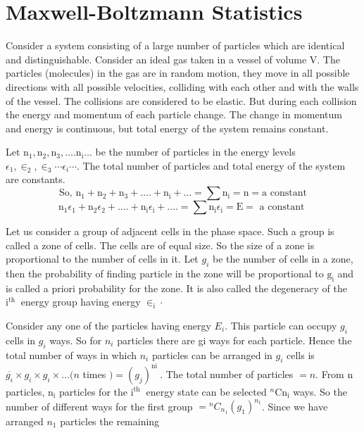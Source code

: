 \section{Maxwell-Boltzmann Statistics}
Consider a system consisting of a large number of particles which are identical and distinguishable. Consider an ideal gas taken in a vessel of volume V. The particles (molecules) in the gas are in random motion, they move in all possible directions with all possible velocities, colliding with each other and with the walls of the vessel. The collisions are considered to be elastic. But during each collision the energy and momentum of each particle change. The change in momentum and energy is continuous, but total energy of the system remains constant.\\
\par Let $\mathrm{n}_{1}, \mathrm{n}_{2}, \mathrm{n}_{3}, \ldots . \mathrm{n}_{\mathrm{i}} \ldots$ be the number of particles in the energy levels $\epsilon_{1}, \in_{2}, \in_{3} \cdots \epsilon_{i} \cdots$. The total number of particles and total energy of the system are constants.
\begin{equation}
\text{So, }\mathrm{n}_{1}+\mathrm{n}_{2}+\mathrm{n}_{3}+\ldots .+\mathrm{n}_{\mathrm{i}}+\ldots=\sum \mathrm{n}_{\mathrm{i}}=\mathrm{n}=\mathrm{a}\text{ constant}
\end{equation}
\begin{equation}
\mathrm{n}_{1} \epsilon_{1}+\mathrm{n}_{2} \epsilon_{2}+\ldots .+\mathrm{n}_{\mathrm{i}} \epsilon_{\mathrm{i}}+\ldots .=\sum \mathrm{n}_{\mathrm{i}} \epsilon_{\mathrm{i}}=\mathrm{E}=\text { a constant }
\end{equation}
\par Let us consider a group of adjacent cells in the phase space. Such a group is called a zone of cells. The cells are of equal size. So the size of a zone is proportional to the number of cells in it. Let $g_{i}$ be the number of cells in a zone, then the probability of finding particle in the zone will be proportional to $\mathrm{g}_{\mathrm{i}}$ and is called a priori probability for the zone. It is also called the degeneracy of the $\mathrm{i}^{\text {th }}$ energy group having energy $\in_{\mathrm{i}} \cdot$\\
\par Consider any one of the particles having energy $E_{i}$. This particle can occupy $g_{i}$ cells in $g_{i}$ ways. So for $n_{i}$ particles there are gi ways for each particle. Hence the total number of ways in which $n_{i}$ particles can be arranged in $g_{i}$ cells is $\overline{g_{i}} \times g_{i} \times g_{i} \times \ldots(n$ times $)=\left(g_{j}\right)^{\text {ni }}$. The total number of particles $=n$. From $\mathrm{n}$ particles, $\mathrm{n}_{\mathrm{i}}$ particles for the $\mathrm{i}^{\text {th }}$ energy state can be selected ${ }^{n} \mathrm{Cn}_{\mathrm{i}}$ ways. So the number of different ways for the first group $={ }^{n} C_{n_{1}}\left(g_{1}\right)^{n_{1}}$. Since we have arranged $n_{1}$ particles the remaining\\\\
